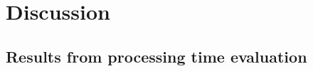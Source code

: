 \documentclass[ExampleMasters.tex]{subfiles}
\begin{document}
\clearpage
{\pagestyle{empty}\cleardoublepage}%
\chapter{Discussion}
\label{chap:discussion}



\section{Results from processing time evaluation}
\label{sec:results_processing_time}
\end{document}
